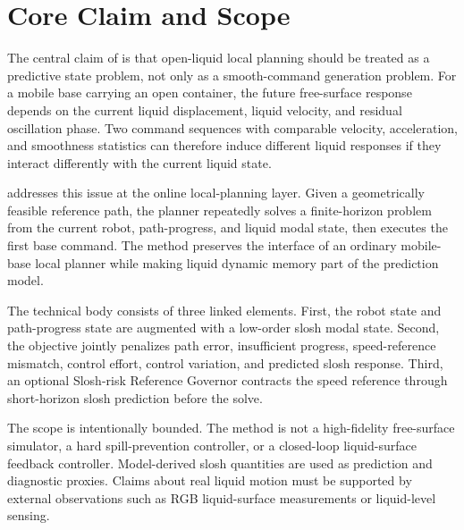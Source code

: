 \section{Core Claim and Scope}

The central claim of \SPMPC{} is that open-liquid local planning should be treated as a predictive state problem, not only as a smooth-command generation problem.
For a mobile base carrying an open container, the future free-surface response depends on the current liquid displacement, liquid velocity, and residual oscillation phase.
Two command sequences with comparable velocity, acceleration, and smoothness statistics can therefore induce different liquid responses if they interact differently with the current liquid state.

\SPMPC{} addresses this issue at the online local-planning layer.
Given a geometrically feasible reference path, the planner repeatedly solves a finite-horizon \MPCC{} problem from the current robot, path-progress, and liquid modal state, then executes the first base command.
The method preserves the interface of an ordinary mobile-base local planner while making liquid dynamic memory part of the prediction model.

The technical body consists of three linked elements.
First, the robot state and path-progress state are augmented with a low-order slosh modal state.
Second, the \MPCC{} objective jointly penalizes path error, insufficient progress, speed-reference mismatch, control effort, control variation, and predicted slosh response.
Third, an optional Slosh-risk Reference Governor contracts the speed reference through short-horizon slosh prediction before the \MPCC{} solve.

The scope is intentionally bounded.
The method is not a high-fidelity free-surface simulator, a hard spill-prevention controller, or a closed-loop liquid-surface feedback controller.
Model-derived slosh quantities are used as prediction and diagnostic proxies.
Claims about real liquid motion must be supported by external observations such as RGB liquid-surface measurements or liquid-level sensing.
